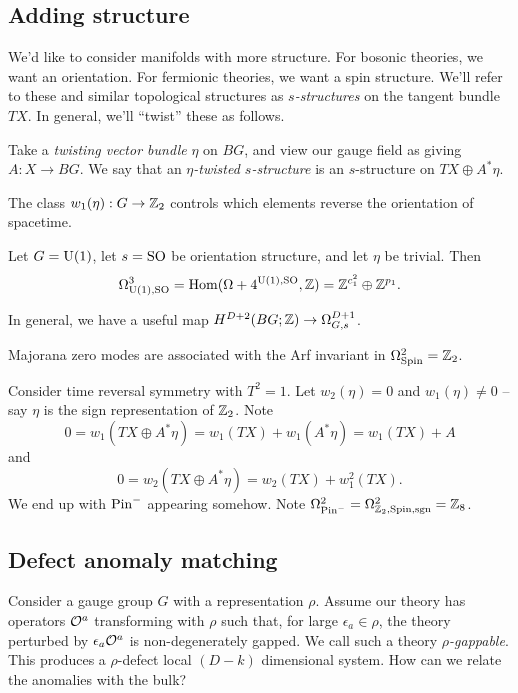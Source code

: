 \subsection{Adding structure}

We'd like to consider manifolds with more structure.
For bosonic theories, we want an orientation.
For fermionic theories, we want a spin structure.
We'll refer to these and similar topological structures as \emph{$s$-structures} on the tangent bundle $TX$.
In general, we'll ``twist'' these as follows.

Take a \emph{twisting vector bundle} $\eta$ on $BG$, and view our gauge field as giving $A: X \to BG$.
We say that an \emph{$\eta$-twisted $s$-structure} is an $s$-structure on $TX \oplus A^* \eta$.

The class $w_1(\eta): G \to \mathbb{Z}_2$ controls which elements reverse the orientation of spacetime.

\begin{ex}
	Let $G = \mathrm{U}(1)$, let $s = \mathrm{SO}$ be orientation structure, and let $\eta$ be trivial.
	Then
	\[
		\Omega^3_{\mathrm{U}(1),\mathrm{SO}} = \operatorname{Hom}(\Omega+4^{\mathrm{U}(1),\mathrm{SO}}, \mathbb{Z}) = \mathbb{Z}^{c_1^2} \oplus \mathbb{Z}^{p_1}.
	\]
\end{ex}

In general, we have a useful map $H^{D+2}(BG; \mathbb{Z}) \to \Omega^{D+1}_{G,s}$.

\begin{ex}
	Majorana zero modes are associated with the Arf invariant in $\Omega^2_{\mathrm{Spin}} = \mathbb{Z}_2$.
\end{ex}

\begin{ex}
	Consider time reversal symmetry with $T^2 = 1$.
	Let $w_2(\eta) = 0$ and $w_1(\eta) \neq 0$ -- say $\eta$ is the sign representation of $\mathbb{Z}_2$.
	Note
	\[
		0 = w_1(TX \oplus A^* \eta) = w_1(TX) + w_1(A^* \eta) = w_1(TX) + A
	\]
	and
	\[
		0 = w_2(TX \oplus A^* \eta) = w_2(TX) + w_1^2(TX).
	\]
	We end up with $\mathrm{Pin}^-$ appearing somehow.
	Note $\Omega^2_{\mathrm{Pin}^-} = \Omega^2_{\mathbb{Z}_2,\mathrm{Spin},\operatorname{sgn}} = \mathbb{Z}_8$.
\end{ex}

\subsection{Defect anomaly matching}

Consider a gauge group $G$ with a representation $\rho$.
Assume our theory has operators $\mathcal{O}^a$ transforming with $\rho$ such that, for large $\epsilon_a \in \rho$, the theory perturbed by $\epsilon_a \mathcal{O}^a$ is non-degenerately gapped.
We call such a theory \emph{$\rho$-gappable}.
This produces a $\rho$-defect local $(D-k)$ dimensional system.
How can we relate the anomalies with the bulk?

